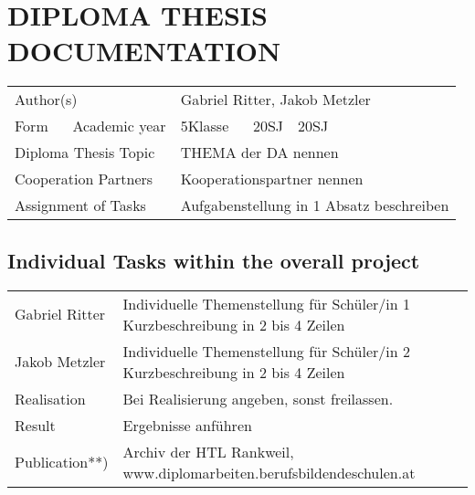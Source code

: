 \section *{DIPLOMA THESIS DOCUMENTATION}

\begin{tabular}{@{}p{5cm}p{8cm}}
	Author(s) & Gabriel Ritter, Jakob Metzler\\
	
	Form ~\textbar~ Academic year & 5Klasse ~\textbar~ 20SJ~\textbar~20SJ \\
	
	Diploma Thesis Topic & THEMA der DA nennen \\
	
	Cooperation Partners & Kooperationspartner nennen \\
	
	Assignment of Tasks & Aufgabenstellung in 1 Absatz beschreiben \\
\end{tabular}

\pagebreak

\subsection *{Individual Tasks within the overall project}
\begin{tabular}{@{}p{5cm}p{8cm}}
	
	Gabriel Ritter & 	Individuelle Themenstellung für Schüler/in 1
	Kurzbeschreibung in 2 bis 4 Zeilen \\
	
	Jakob Metzler & 	Individuelle Themenstellung für Schüler/in 2	
	Kurzbeschreibung in 2 bis 4 Zeilen \\
	
	Realisation & Bei Realisierung angeben, sonst freilassen.  \\
	
	Result & Ergebnisse anführen \\
	
	Publication**) & Archiv der HTL Rankweil, \newline  www.diplomarbeiten.berufsbildendeschulen.at \\
\end{tabular}
